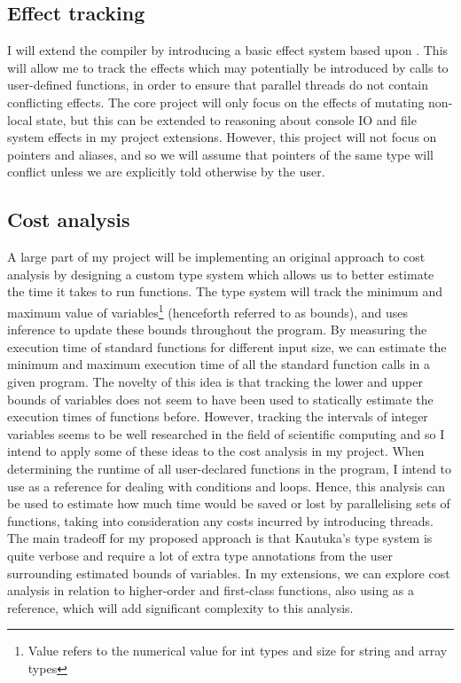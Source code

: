 \begin{refsection}
  \subsection*{Effect tracking}

  I will extend the compiler by introducing a basic effect system based upon \cite{Optimising-Compilers-Lecture-13-Effect-Systems}. This will allow me to track the effects which may potentially be introduced by calls to user-defined functions, in order to ensure that parallel threads do not contain conflicting effects. The core project will only focus on the effects of mutating non-local state, but this can be extended to reasoning about console IO and file system effects in my project extensions. However, this project will not focus on pointers and aliases, and so we will assume that pointers of the same type will conflict unless we are explicitly told otherwise by the user.

  \subsection*{Cost analysis}

  A large part of my project will be implementing an original approach to cost analysis by designing a custom type system which allows us to better estimate the time it takes to run functions. The type system will track the minimum and maximum value of variables\footnote{Value refers to the numerical value for int types and size for string and array types} (henceforth referred to as bounds), and uses inference to update these bounds throughout the program. By measuring the execution time of standard functions for different input size, we can estimate the minimum and maximum execution time of all the standard function calls in a given program. The novelty of this idea is that tracking the lower and upper bounds of variables does not seem to have been used to statically estimate the execution times of functions before. However, tracking the intervals of integer variables seems to be well researched in the field of scientific computing and so I intend to apply some of these ideas to the cost analysis in my project. When determining the runtime of all user-declared functions in the program, I intend to use \cite{10.1145/361002.361016} as a reference for dealing with conditions and loops. Hence, this analysis can be used to estimate how much time would be saved or lost by parallelising sets of functions, taking into consideration any costs incurred by introducing threads. The main tradeoff for my proposed approach is that Kautuka's type system is quite verbose and require a lot of extra type annotations from the user surrounding estimated bounds of variables. In my extensions, we can explore cost analysis in relation to higher-order and first-class functions, also using \cite{10.1145/361002.361016} as a reference, which will add significant complexity to this analysis.


\end{refsection}
